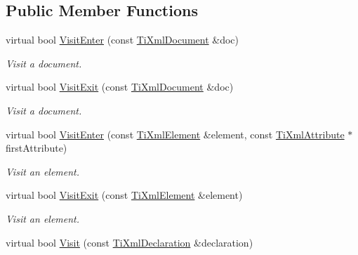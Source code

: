 \subsection*{\-Public \-Member \-Functions}
\begin{DoxyCompactItemize}
\item 
\hypertarget{class_ti_xml_printer_a2ec73087db26ff4d2c4316c56f861db7}{virtual bool \hyperlink{class_ti_xml_printer_a2ec73087db26ff4d2c4316c56f861db7}{\-Visit\-Enter} (const \hyperlink{class_ti_xml_document}{\-Ti\-Xml\-Document} \&doc)}\label{class_ti_xml_printer_a2ec73087db26ff4d2c4316c56f861db7}

\begin{DoxyCompactList}\small\item\em \-Visit a document. \end{DoxyCompactList}\item 
\hypertarget{class_ti_xml_printer_a0a636046fa589b6d7f3e5bd025b3f33e}{virtual bool \hyperlink{class_ti_xml_printer_a0a636046fa589b6d7f3e5bd025b3f33e}{\-Visit\-Exit} (const \hyperlink{class_ti_xml_document}{\-Ti\-Xml\-Document} \&doc)}\label{class_ti_xml_printer_a0a636046fa589b6d7f3e5bd025b3f33e}

\begin{DoxyCompactList}\small\item\em \-Visit a document. \end{DoxyCompactList}\item 
\hypertarget{class_ti_xml_printer_a6dccaf5ee4979f13877690afe28721e8}{virtual bool \hyperlink{class_ti_xml_printer_a6dccaf5ee4979f13877690afe28721e8}{\-Visit\-Enter} (const \hyperlink{class_ti_xml_element}{\-Ti\-Xml\-Element} \&element, const \hyperlink{class_ti_xml_attribute}{\-Ti\-Xml\-Attribute} $\ast$first\-Attribute)}\label{class_ti_xml_printer_a6dccaf5ee4979f13877690afe28721e8}

\begin{DoxyCompactList}\small\item\em \-Visit an element. \end{DoxyCompactList}\item 
\hypertarget{class_ti_xml_printer_ae6a1df8271df4bf62d7873c38e34aa69}{virtual bool \hyperlink{class_ti_xml_printer_ae6a1df8271df4bf62d7873c38e34aa69}{\-Visit\-Exit} (const \hyperlink{class_ti_xml_element}{\-Ti\-Xml\-Element} \&element)}\label{class_ti_xml_printer_ae6a1df8271df4bf62d7873c38e34aa69}

\begin{DoxyCompactList}\small\item\em \-Visit an element. \end{DoxyCompactList}\item 
\hypertarget{class_ti_xml_printer_adaf7eec4dc43ad071ff52b60361574f5}{virtual bool \hyperlink{class_ti_xml_printer_adaf7eec4dc43ad071ff52b60361574f5}{\-Visit} (const \hyperlink{class_ti_xml_declaration}{\-Ti\-Xml\-Declaration} \&declaration)}\label{class_ti_xml_printer_adaf7eec4dc43ad071ff52b60361574f5}


\end{DoxyCompactItemize}
